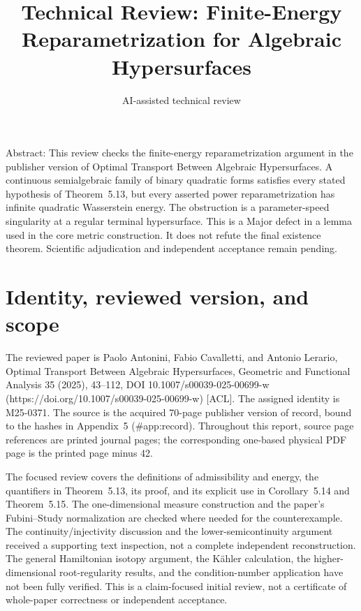 \documentclass[10pt]{article}
\title{Technical Review: Finite-Energy Reparametrization for Algebraic Hypersurfaces}
\author{AI-assisted technical review}
\date{}
\begin{document}
\maketitle
Abstract: This review checks the finite-energy reparametrization argument in the publisher version of Optimal Transport Between Algebraic Hypersurfaces. A continuous semialgebraic family of binary quadratic forms satisfies every stated hypothesis of Theorem 5.13, but every asserted power reparametrization has infinite quadratic Wasserstein energy. The obstruction is a parameter-speed singularity at a regular terminal hypersurface. This is a Major defect in a lemma used in the core metric construction. It does not refute the final existence theorem. Scientific adjudication and independent acceptance remain pending.\par
\section*{Identity, reviewed version, and scope}
The reviewed paper is Paolo Antonini, Fabio Cavalletti, and Antonio Lerario, Optimal Transport Between Algebraic Hypersurfaces, Geometric and Functional Analysis 35 (2025), 43–112, DOI 10.1007/s00039-025-00699-w (https://doi.org/10.1007/s00039-025-00699-w) [ACL]. The assigned identity is M25-0371. The source is the acquired 70-page publisher version of record, bound to the hashes in Appendix 5 (\#app:record). Throughout this report, source page references are printed journal pages; the corresponding one-based physical PDF page is the printed page minus 42.\par
The focused review covers the definitions of admissibility and energy, the quantifiers in Theorem 5.13, its proof, and its explicit use in Corollary 5.14 and Theorem 5.15. The one-dimensional measure construction and the paper’s Fubini–Study normalization are checked where needed for the counterexample. The continuity/injectivity discussion and the lower-semicontinuity argument received a supporting text inspection, not a complete independent reconstruction. The general Hamiltonian isotopy argument, the Kähler calculation, the higher-dimensional root-regularity results, and the condition-number application have not been fully verified. This is a claim-focused initial review, not a certificate of whole-paper correctness or independent acceptance.\par
\end{document}
